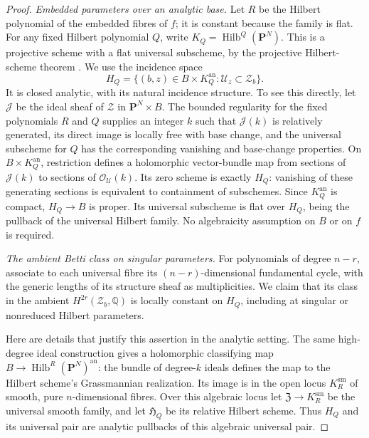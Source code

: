 \documentclass[11pt]{amsart}
\newcommand{\Q}{\mathbb Q}
\newcommand{\PP}{\mathbf P}
\theoremstyle{definition}
\theoremstyle{remark}
\numberwithin{equation}{section}
\begin{document}
\begin{proof}
\emph{Embedded parameters over an analytic base.}
Let $R$ be the Hilbert polynomial of the embedded fibres of $f$; it is
constant because the family is flat.  For any fixed Hilbert polynomial
$Q$, write $K_Q=\operatorname{Hilb}^{Q}(\PP^N)$.  This is a projective
scheme with a flat universal subscheme, by the projective Hilbert-scheme
theorem \cite[Theorem~3.2]{GrothendieckHilbert}.  We use the incidence
space
\[
 H_Q=\{(b,z)\in B\times K_Q^{\mathrm{an}}:
                    \mathcal U_z\subset\mathcal Z_b\}.
\]
It is closed analytic, with its natural incidence structure.  To see
this directly, let $\mathcal J$ be the ideal sheaf of $\mathcal Z$ in
$\PP^N\times B$.  The bounded regularity for the fixed polynomials
$R$ and $Q$ supplies an integer $k$ such that $\mathcal J(k)$ is
relatively generated, its direct image is locally free with base
change, and the universal subscheme for $Q$ has the corresponding
vanishing and base-change properties.  On $B\times K_Q^{\mathrm{an}}$,
restriction defines a holomorphic vector-bundle map from sections of
$\mathcal J(k)$ to sections of $\mathcal O_{\mathcal U}(k)$.  Its zero
scheme is exactly $H_Q$: vanishing of these generating sections is
equivalent to containment of subschemes.  Since $K_Q^{\mathrm{an}}$ is
compact, $H_Q\to B$ is proper.  Its universal subscheme is flat over
$H_Q$, being the pullback of the universal Hilbert family.  No
algebraicity assumption on $B$ or on $f$ is required.

\emph{The ambient Betti class on singular parameters.}
For polynomials of degree $n-r$, associate to each universal fibre its
$(n-r)$-dimensional fundamental cycle, with the generic lengths of its
structure sheaf as multiplicities.  We claim that its class in the
ambient $H^{2r}(\mathcal Z_b,\Q)$ is locally constant on $H_Q$, including
at singular or nonreduced Hilbert parameters.

Here are details that justify this assertion in the analytic setting.
The same high-degree ideal construction gives a holomorphic
classifying map $B\to\operatorname{Hilb}^{R}(\PP^N)^{\mathrm{an}}$:
the bundle of degree-$k$ ideals defines the map to the Hilbert
scheme's Grassmannian realization.  Its image is in the open locus
$K_R^{\mathrm{sm}}$ of smooth, pure $n$-dimensional fibres.  Over this
algebraic locus let $\mathfrak Z\to K_R^{\mathrm{sm}}$ be the universal
smooth family, and let $\mathfrak H_Q$ be its relative Hilbert scheme.
Thus $H_Q$ and its universal pair are analytic pullbacks of this
algebraic universal pair.


\end{proof}
\end{document}

